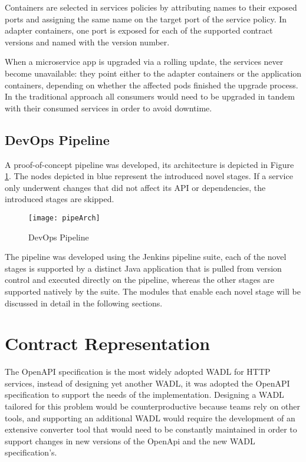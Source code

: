 Containers are selected in services policies by attributing names to their exposed ports and assigning the same name on the target port of the service policy.
In adapter containers, one port is exposed for each of the supported contract versions and named with the version number.

When a microservice app is upgraded via a rolling update,
the services never become unavailable:
they point either to the adapter containers or the application containers, depending on whether the affected pods finished the upgrade process.
In the traditional approach all consumers would need to be upgraded in tandem with their consumed services in order to avoid downtime.

\subsection{DevOps Pipeline} %
\label{sec:devops_pipeline_architecture}

A proof-of-concept pipeline was developed, its architecture is depicted in Figure \ref{fig:pipeline}.
The nodes depicted in blue represent the introduced novel stages.
If a service only underwent changes that did not affect its API or dependencies, the introduced stages are skipped.

\begin{figure}[htbp]
    \centering
    \texttt{[image: pipeArch]}
    \caption{DevOps Pipeline}
    \label{fig:pipeline}
\end{figure}

The pipeline was developed using the Jenkins pipeline suite, each of the novel stages is supported by a distinct Java application that is pulled from version control
and executed directly on the pipeline, whereas the other stages are supported natively by the suite.
The modules that enable each novel stage will be discussed in detail in the following sections.

\section{Contract Representation} %
\label{sec:contract_representation}

The OpenAPI specification is the most
widely adopted WADL for HTTP services, instead of designing yet another WADL, it was
adopted the OpenAPI specification to support the needs of the implementation.
Designing a WADL tailored for this problem would be counterproductive because teams rely on other tools,
and supporting an additional WADL would require the development of an extensive converter tool
that would need to be constantly maintained in order to support changes in new versions of the OpenApi and the new WADL specification's.

